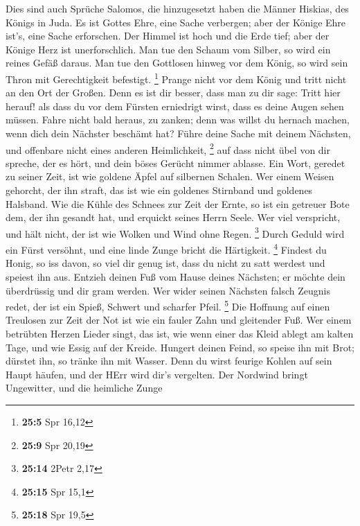 Dies sind auch Sprüche Salomos, die hinzugesetzt haben die
Männer Hiskias, des Königs in Juda.  Es ist Gottes Ehre,
eine Sache verbergen; aber der Könige Ehre ist's, eine Sache erforschen.
 Der Himmel ist hoch und die Erde tief; aber der Könige Herz
ist unerforschlich.  Man tue den Schaum vom Silber, so wird
ein reines Gefäß daraus.  Man tue den Gottlosen hinweg vor
dem König, so wird sein Thron mit Gerechtigkeit befestigt. \footnote{\textbf{25:5}
  Spr 16,12}  Prange nicht vor dem König und tritt nicht an
den Ort der Großen.  Denn es ist dir besser, dass man zu dir
sage: Tritt hier herauf! als dass du vor dem Fürsten erniedrigt wirst,
dass es deine Augen sehen müssen.  Fahre nicht bald heraus,
zu zanken; denn was willst du hernach machen, wenn dich dein Nächster
beschämt hat?  Führe deine Sache mit deinem Nächsten, und
offenbare nicht eines anderen Heimlichkeit, \footnote{\textbf{25:9} Spr
  20,19}  auf dass nicht übel von dir spreche, der es hört,
und dein böses Gerücht nimmer ablasse.  Ein Wort, geredet
zu seiner Zeit, ist wie goldene Äpfel auf silbernen Schalen.
 Wer einem Weisen gehorcht, der ihn straft, das ist wie ein
goldenes Stirnband und goldenes Halsband.  Wie die Kühle
des Schnees zur Zeit der Ernte, so ist ein getreuer Bote dem, der ihn
gesandt hat, und erquickt seines Herrn Seele.  Wer viel
verspricht, und hält nicht, der ist wie Wolken und Wind ohne Regen.
\footnote{\textbf{25:14} 2Petr 2,17}  Durch Geduld wird ein
Fürst versöhnt, und eine linde Zunge bricht die Härtigkeit. \footnote{\textbf{25:15}
  Spr 15,1}  Findest du Honig, so iss davon, so viel dir
genug ist, dass du nicht zu satt werdest und speiest ihn aus.
 Entzieh deinen Fuß vom Hause deines Nächsten; er möchte
dein überdrüssig und dir gram werden.  Wer wider seinen
Nächsten falsch Zeugnis redet, der ist ein Spieß, Schwert und scharfer
Pfeil. \footnote{\textbf{25:18} Spr 19,5}  Die Hoffnung auf
einen Treulosen zur Zeit der Not ist wie ein fauler Zahn und gleitender
Fuß.  Wer einem betrübten Herzen Lieder singt, das ist, wie
wenn einer das Kleid ablegt am kalten Tage, und wie Essig auf der
Kreide.  Hungert deinen Feind, so speise ihn mit Brot;
dürstet ihn, so tränke ihn mit Wasser.  Denn du wirst
feurige Kohlen auf sein Haupt häufen, und der HErr wird dir's vergelten.
 Der Nordwind bringt Ungewitter, und die heimliche Zunge
